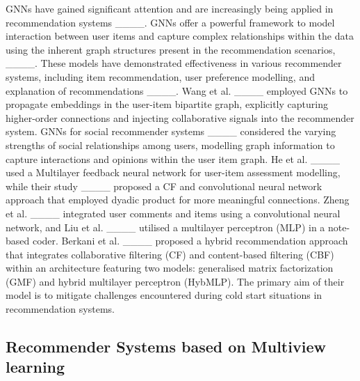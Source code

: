      GNNs have gained significant attention and are increasingly being applied in recommendation systems ____. GNNs offer a powerful framework to model interaction between user items and capture complex relationships within the data using the inherent graph structures present in the recommendation scenarios,  ____. These models have demonstrated effectiveness in various recommender systems, including item recommendation, user preference modelling, and explanation of recommendations ____. Wang et al. ____ employed GNNs to propagate embeddings in the user-item bipartite graph, explicitly capturing higher-order connections and injecting collaborative signals into the recommender system. GNNs for social recommender systems ____ considered the varying strengths of social relationships among users, modelling graph information to capture interactions and opinions within the user item graph. He et al. ____ used a Multilayer feedback neural network for user-item assessment modelling, while their study ____ proposed a CF and convolutional neural network approach that employed dyadic product for more meaningful connections. Zheng et al. ____ integrated user comments and items using a convolutional neural network, and Liu et al. ____ utilised a multilayer perceptron (MLP) in a note-based coder. Berkani et al. ____ proposed a hybrid recommendation approach that integrates collaborative filtering (CF) and content-based filtering (CBF) within an architecture featuring two models: generalised matrix factorization (GMF) and hybrid multilayer perceptron (HybMLP). The primary aim of their model is to mitigate challenges encountered during cold start situations in recommendation systems.
    
\subsection{Recommender Systems based on Multiview learning}

